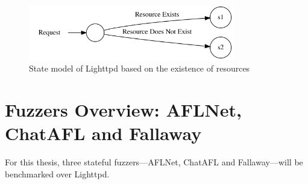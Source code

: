 \begin{figure}[H]
    \centering
    \includegraphics[width=0.8\textwidth]{Images/existent_nonexistent_resource.png}
    \caption{State model of Lighttpd based on the existence of resources}
    \label{fig:existent_nonexistent_resource_statemodel}
\end{figure}

\section{Fuzzers Overview: AFLNet, ChatAFL and Fallaway}

For this thesis, three stateful fuzzers—AFLNet, ChatAFL and Fallaway—will be benchmarked over Lighttpd.
 
